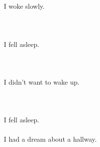 \documentclass{article}
\begin{document}
    \section{}
    I woke slowly.\\\\ 
    \newpage
    
    \section{}
    I fell asleep.\\\\ 
    \newpage
    
    \section{}
    I didn't want to wake up.\\\\ 
    \newpage
    
    \section{}
    I fell asleep.\\\\I had a dream about a hallway.\\\\ 
    \newpage
    
    
\end{document}
